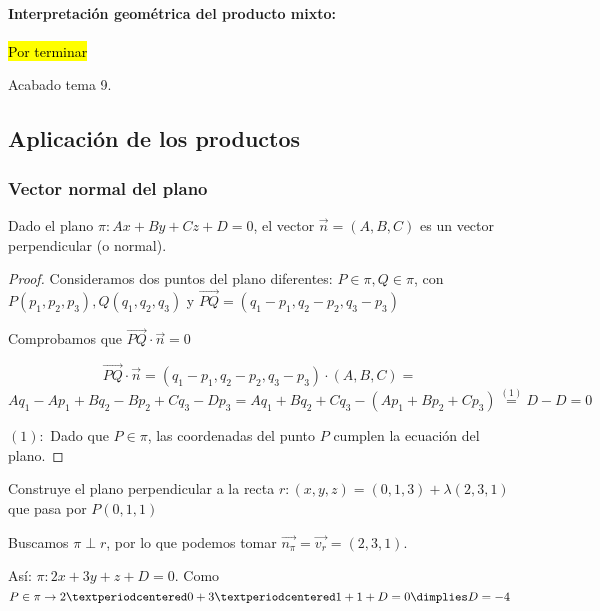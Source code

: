 \paragraph{Interpretación geométrica del producto mixto:}
\hl{Por terminar}

\obs Acabado tema 9.

\subsection{Aplicación de los productos}

\subsubsection{Vector normal del plano}

\begin{prop}
Dado el plano $\pi:Ax+By+Cz+D=0$, el vector $\vec{n} = (A,B,C)$ es un vector perpendicular (o normal).
\end{prop}

\begin{proof}

Consideramos dos puntos del plano diferentes: $P\in\pi, Q\in\pi$, con $P(p_1,p_2,p_3), Q(q_1,q_2,q_3)$ y $\vec{PQ} = (q_1-p_1,q_2-p_2,q_3-p_3)$

Comprobamos que $ \vec{PQ}·\vec{n} = 0$

\[\vec{PQ}·\vec{n} =  (q_1-p_1,q_2-p_2,q_3-p_3)·(A,B,C) =\]
\[ Aq_1-Ap_1+Bq_2-Bp_2+Cq_3-Dp_3 = Aq_1+Bq_2+Cq_3 - (Ap_1+Bp_2+Cp_3) \overset{(1)}{=} D - D = 0\]

$(1):$ Dado que $P\in\pi$, las coordenadas del punto $P$ cumplen la ecuación del plano.
\end{proof}

\begin{problem}

Construye el plano perpendicular a la recta $r: (x,y,z) = (0,1,3) + \lambda (2,3,1)$ que pasa por $P(0,1,1)$

\solution

Buscamos $\pi\perp r$, por lo que podemos tomar $\vec{n_{\pi}} = \vec{v_r} = (2,3,1)$.

Así: $\pi: 2x+3y+z+D=0$. Como $P\in\pi \to 2·0+3·1+1+D = 0 \dimplies D=-4$
\end{problem}


